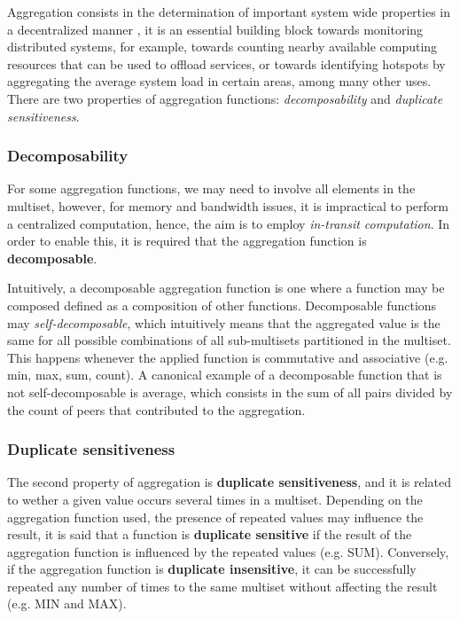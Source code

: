 Aggregation consists in the determination of important system wide properties in a decentralized manner \cite{DBLP:journals/corr/abs-1110-0725}, it is an essential building block towards monitoring distributed systems, for example, towards counting nearby available computing resources that can be used to offload services, or towards identifying hotspots by aggregating the average system load in certain areas, among many other uses. There are two properties of aggregation functions: \textit{decomposability} and \textit{duplicate sensitiveness}.

\subsubsection*{Decomposability}

For some aggregation functions, we may need to involve all elements in the multiset, however, for memory and bandwidth issues, it is impractical to perform a centralized computation, hence, the aim is to employ \textit{in-transit computation}. In order to enable this, it is required that the aggregation function is \textbf{decomposable}. 

Intuitively, a decomposable aggregation function is one where a function may be composed defined as a composition of other functions. Decomposable functions may \textit{self-decomposable}, which intuitively means that the aggregated value is the same for all possible combinations of all sub-multisets partitioned in the multiset. This happens whenever the applied function is commutative and associative (e.g. min, max, sum, count). A canonical example of a decomposable function that is not self-decomposable is average, which consists in the sum of all pairs divided by the count of peers that contributed to the aggregation.

\subsubsection*{Duplicate sensitiveness}

The second property of aggregation is \textbf{duplicate sensitiveness}, and it is related to wether a given value occurs several times in a multiset. Depending on the aggregation function used, the presence of repeated values may influence the result, it is said that a function is \textbf{duplicate sensitive} if the result of the aggregation function is influenced by the repeated values (e.g. SUM). Conversely, if the aggregation function is \textbf{duplicate insensitive}, it can be successfully repeated any number of times to the same multiset without affecting the result (e.g. MIN and MAX).

